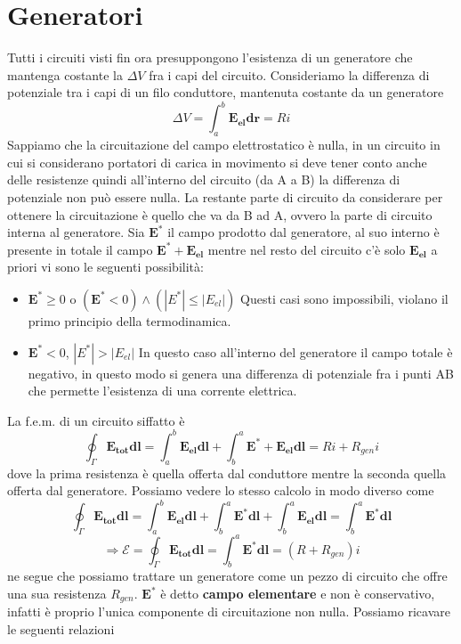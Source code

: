 \documentclass[10pt,a4paper]{article}
\begin{document}
\section{Generatori}
Tutti i circuiti visti fin ora presuppongono l'esistenza di un generatore che mantenga costante la \(\Delta V\) fra i capi del circuito. Consideriamo la differenza di potenziale tra i capi di un filo conduttore, mantenuta costante da un generatore
\[\Delta V = \int_a^b \mathbf{E_{el}}\mathbf{dr}= Ri\]
Sappiamo che la circuitazione del campo elettrostatico è nulla, in un circuito in cui si considerano portatori di carica in movimento si deve tener conto anche delle resistenze quindi all'interno del circuito (da A a B) la differenza di potenziale non può essere nulla. La restante parte di circuito da considerare per ottenere la circuitazione è quello che va da B ad A, ovvero la parte di circuito interna al generatore. Sia \(\mathbf{E^*}\) il campo prodotto dal generatore, al suo interno è presente in totale il campo \(\mathbf{E^*}+\mathbf{E_{el}}\) mentre nel resto del circuito c'è solo \(\mathbf{E_{el}}\) a priori vi sono le seguenti possibilità:
\begin{itemize}
	\item \(\mathbf{E^*} \geq 0\) o \((\mathbf{E^*} < 0) \wedge (|{E^*}| \leq |{E_{el}}|)\) Questi casi sono impossibili, violano il primo principio della termodinamica.
	\item \(\mathbf{E^*} < 0\),  \(|{E^*}| > |{E_{el}}|\) In questo caso all'interno del generatore il campo totale è negativo, in questo modo si genera una differenza di potenziale fra i punti AB che permette l'esistenza di una corrente elettrica. 
\end{itemize}
La f.e.m. di un circuito siffatto è 
\[\oint_{\Gamma}\mathbf{E_{tot}}\mathbf{dl}= \int_{a}^{b}\mathbf{E_{el}}\mathbf{dl}+\int_{b}^{a}\mathbf{E^*}+\mathbf{E_{el}}\mathbf{dl}= Ri + R_{gen}i\]
dove la prima resistenza è quella offerta dal conduttore mentre la seconda quella offerta dal generatore. Possiamo vedere lo stesso calcolo in modo diverso come
\[\oint_{\Gamma}\mathbf{E_{tot}}\mathbf{dl}= \int_{a}^{b}\mathbf{E_{el}}\mathbf{dl} + \int_{b}^{a}\mathbf{E^*}\mathbf{dl} +  \int_{b}^{a}\mathbf{E_{el}}\mathbf{dl}= \int_{b}^{a}\mathbf{E^*}\mathbf{dl}\]
\[\Rightarrow \mathcal{E} = \oint_{\Gamma}\mathbf{E_{tot}}\mathbf{dl} = \int_{b}^{a}\mathbf{E^*}\mathbf{dl} = (R + R_{gen})i \]
ne segue che possiamo trattare un generatore come un pezzo di circuito che offre una sua resistenza \(R_{gen}\). \(\mathbf{E^*}\) è detto \textbf{campo elementare} e non è conservativo, infatti è proprio l'unica componente di circuitazione non nulla. Possiamo ricavare le seguenti relazioni
\end{document}
